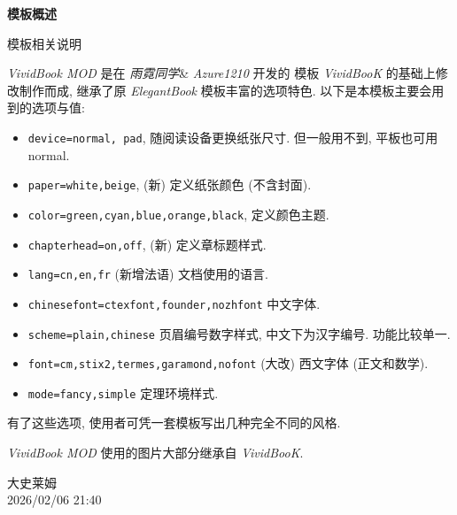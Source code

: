 \frontmatter
\thispagestyle{empty}
\newpage
\begin{center}
	\textbf{\LARGE 模板概述}
\end{center}
\begin{ascolorbox1}{模板相关说明} 

\textit{VividBook MOD} 是在 \textit{雨霓同学}\& \textit{Azure1210} 开发的 \LaTeXe{} 模板 \textit{VividBooK} 的基础上修改制作而成, 继承了原 \textit{ElegantBook} 模板丰富的选项特色. 以下是本模板主要会用到的选项与值:

 \begin{itemize}
     \item \texttt{device=normal, pad}, 随阅读设备更换纸张尺寸. 但一般用不到, 平板也可用 normal.
     \item \texttt{paper=white,beige}, (新) 定义纸张颜色 (不含封面).
     \item \texttt{color=green,cyan,blue,orange,black}, 定义颜色主题. 
     \item \texttt{chapterhead=on,off}, (新) 定义章标题样式.
     \item \texttt{lang=cn,en,fr} (新增法语) 文档使用的语言.
     \item \texttt{chinesefont=ctexfont,founder,nozhfont} 中文字体. 
     \item \texttt{scheme=plain,chinese} 页眉编号数字样式, 中文下为汉字编号. 功能比较单一.
     \item \texttt{font=cm,stix2,termes,garamond,nofont} (大改) 西文字体 (正文和数学). 
     \item \texttt{mode=fancy,simple} 定理环境样式.
 \end{itemize}

 有了这些选项, 使用者可凭一套模板写出几种完全不同的风格.

 \textit{VividBook MOD} 使用的图片大部分继承自 \textit{VividBooK}.
\end{ascolorbox1}
\begin{flushright}
	大史莱姆 \\
	2026/02/06 21:40
\end{flushright}

\frontmatter